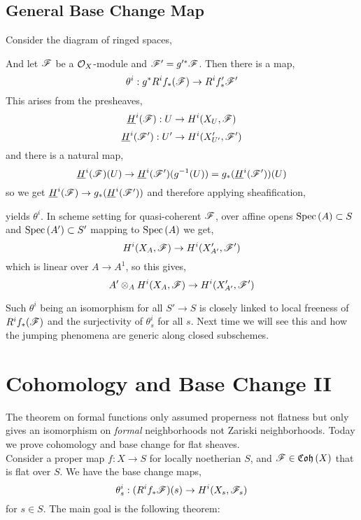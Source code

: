 \documentclass[12pt]{article}
\begin{document}
\subsection{General Base Change Map}

Consider the diagram of ringed spaces,
\begin{center}
\end{center}
And let $\mathscr{F}$ be a $\mathcal{O}_{X}$-module and $\mathscr{F}' = g'^* \mathscr{F}$. Then there is a map,
\[ \theta^i : g^* R^i f_* (\mathscr{F}) \to R^i f'_* \mathscr{F}' \]
This arises from the presheaves,
\[ \underline{H}^i(\mathscr{F}) : U \to H^i(X_U, \mathscr{F}) \]
\[ \underline{H}^i(\mathscr{F}') : U' \to H^i(X'_{U'}, \mathscr{F}') \]
and there is a natural map,
\[ \underline{H}^i(\mathscr{F})(U) \to \underline{H}^i(\mathscr{F}')(g^{-1}(U)) = g_* (\underline{H}^i(\mathscr{F}'))(U) \]
so we get $\underline{H}^i(\mathscr{F}) \to g_* (\underline{H}^i(\mathscr{F}'))$ and therefore applying sheafification,
\begin{center}
\end{center}
yields $\theta^i$. In scheme setting for quasi-coherent $\mathscr{F}$, over affine opens $\mathrm{Spec}\left( A \right) \subset S$ and $\mathrm{Spec}\left( A' \right) \subset S'$ mapping to $\mathrm{Spec}\left( A \right)$ we get,
\[ H^i(X_A, \mathscr{F}) \to H^i(X'_{A'}, \mathscr{F}') \]
which is linear over $A \to A^1$, so this gives,
\[ A' \otimes_A H^i(X_A, \mathscr{F}) \to H^i(X'_{A'}, \mathscr{F}') \]

\begin{rmk}
Such $\theta^i$ being an isomorphism for all $S' \to S$ is closely linked to local freeness of $R^i f_* (\mathscr{F})$ and the surjectivity of $\theta^i_s$ for all $s$. Next time we will see this and how the jumping phenomena are generic along closed subschemes. 
\end{rmk}

\section{Cohomology and Base Change II}

The theorem on formal functions only assumed properness not flatness but only gives an isomorphism on \textit{formal} neighborhoods not Zariski neighborhoods. Today we prove cohomology and base change for flat sheaves.
\bigskip\\
Consider a proper map $f : X \to S$ for locally noetherian $S$, and $\mathscr{F} \in \mathfrak{Coh}\left(X\right)$ that is flat over $S$. We have the base change maps,
\[ \theta^i_s : (R^i f_* \mathscr{F})(s) \to H^i(X_s, \mathscr{F}_s) \]
for $s \in S$. The main goal is the following theorem:
\end{document}
